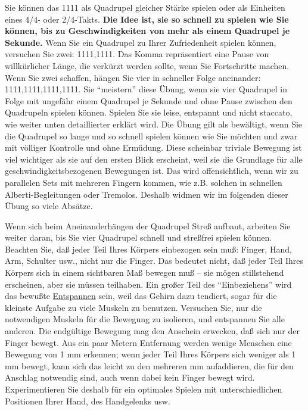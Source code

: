 Sie können das 1111 als Quadrupel gleicher Stärke spielen oder als Einheiten eines 4/4- oder 2/4-Takts.
\textbf{Die Idee ist, sie so schnell zu spielen wie Sie können, bis zu Geschwindigkeiten von mehr als einem Quadrupel je Sekunde.}
Wenn Sie ein Quadrupel zu Ihrer Zufriedenheit spielen können, versuchen Sie zwei: 1111,1111.
Das Komma repräsentiert eine Pause von willkürlicher Länge, die verkürzt werden sollte, wenn Sie Fortschritte machen.
Wenn Sie zwei schaffen, hängen Sie vier in schneller Folge aneinander: 1111,1111,1111,1111.
Sie \enquote{meistern} diese Übung, wenn sie vier Quadrupel in Folge mit ungefähr einem Quadrupel je Sekunde und ohne Pause zwischen den Quadrupeln spielen können.
Spielen Sie sie leise, entspannt und nicht staccato, wie weiter unten detaillierter erklärt wird.
Die Übung gilt als bewältigt, wenn Sie die Quadrupel so lange und so schnell spielen können wie Sie möchten und zwar mit völliger Kontrolle und ohne Ermüdung.
Diese scheinbar triviale Bewegung ist viel wichtiger als sie auf den ersten Blick erscheint, weil sie die Grundlage für alle geschwindigkeitsbezogenen Bewegungen ist.
Das wird offensichtlich, wenn wir zu parallelen Sets mit mehreren Fingern kommen, wie z.B. solchen in schnellen Alberti-Begleitungen oder Tremolos.
Deshalb widmen wir im folgenden dieser Übung so viele Absätze.

Wenn sich beim Aneinanderhängen der Quadrupel Streß aufbaut, arbeiten Sie weiter daran, bis Sie vier Quadrupel schnell und streßfrei spielen können.
Beachten Sie, daß jeder Teil Ihres Körpers einbezogen sein muß: Finger, Hand, Arm, Schulter usw., nicht nur die Finger.
Das bedeutet nicht, daß jeder Teil Ihres Körpers sich in einem sichtbaren Maß bewegen muß -- sie mögen stillstehend erscheinen, aber sie müssen teilhaben.
Ein großer Teil des \enquote{Einbeziehens} wird das bewußte \hyperref[c1ii14]{Entspannen} sein, weil das Gehirn dazu tendiert, sogar für die kleinste Aufgabe zu viele Muskeln zu benutzen.
Versuchen Sie, nur die notwendigen Muskeln für die Bewegung zu isolieren, und entspannen Sie alle anderen.
Die endgültige Bewegung mag den Anschein erwecken, daß sich nur der Finger bewegt.
Aus ein paar Metern Entfernung werden wenige Menschen eine Bewegung von 1 mm erkennen; wenn jeder Teil Ihres Körpers sich weniger als 1 mm bewegt, kann sich das leicht zu den mehreren mm aufaddieren, die für den Anschlag notwendig sind, auch wenn dabei kein Finger bewegt wird.
Experimentieren Sie deshalb  für ein optimales Spielen mit unterschiedlichen Positionen Ihrer Hand, des Handgelenks usw.

